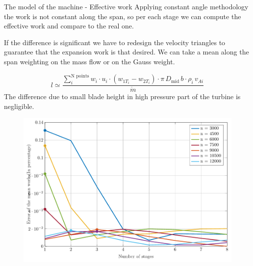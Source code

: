 \documentclass{beamer}
\newcommand{\myspace}[0]{\vspace{0.3cm}}
\newcommand{\dmid}{D_\text{mid}}
\begin{document}
\begin{frame}[t]{The model of the machine - Effective work}
Applying constant angle methodology the work is not constant along the span, so per each stage we can compute the effective work and compare to the real one.

\myspace
If the difference is significant we have to redesign the velocity triangles to guarantee that the expansion work is that desired.
We can take a mean along the span weighting on the mass flow or on the Gauss weight.

\begin{equation}
l  \simeq \frac{\sum_i^{\text{N points}} w_i \cdot u_i \cdot (w_{1T_i} - w_{2T_i}) \cdot \pi \, \dmid \, b \cdot \rho_i \, v_{Ai}}{\dot{m}} 
\end{equation}
The difference due to small blade height in high pressure part of the turbine is negligible.
\end{frame}


\begin{frame}
\begin{figure}[hbtp]
\centering
\includegraphics[scale=0.65]{fig/work_error_perc_example.pdf}
\end{figure}
\end{frame}
\end{document}
